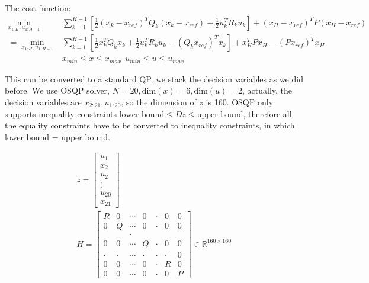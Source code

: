 The cost function:
\begin{align*}
    \min_{x_{1:H}, u_{1:H-1}}   & \sum_{k=1}^{H-1} [\frac{1}{2} (x_k-x_{ref})^T Q_k (x_k-x_{ref}) + \frac{1}{2} u_k^T R_k u_k] + (x_H-x_{ref})^T P (x_H-x_{ref}) \\
    = \min_{x_{1:H}, u_{1:H-1}} & \sum_{k=1}^{H-1} [\frac{1}{2} x_k^T Q_k x_k + \frac{1}{2} u_k^T R_k u_k - (Q_kx_{ref})^Tx_k] + x_H^T P x_H - (Px_{ref})^Tx_H \\
                                & x_{min}\leq x \leq x_{max} \ \  u_{min}\leq u \leq u_{max}
\end{align*}

This can be converted to a standard QP, we stack the decision variables as we did before. We use OSQP solver, $N=20, \text{dim}(x)=6, \text{dim}(u)=2$, actually, the decision variables are $x_{2:21}, u_{1:20}$, so the dimension of $z$ is 160. OSQP only supports inequality constraints $\text{lower bound} \le Dz \le \text{upper bound}$, therefore all the equality constraints have to be converted to inequality constraints, in which lower bound = upper bound.

\begin{gather*}
    z=\begin{bmatrix}
    u_{1}\\
    x_{2}\\
    u_{2}\\
    \vdots \\
    u_{20}\\
    x_{21}
    \end{bmatrix}\\
    H=\begin{bmatrix}
    R & 0 & \cdots  & 0 & \cdotp  & 0 & 0\\
    0 & Q & \cdots  & 0 & \cdotp  & 0 & 0\\
     &  & \cdotp  &  &  &  & \\
    0 & 0 & \cdots  & Q & \cdotp  & 0 & 0\\
    \cdotp  & \cdotp  & \cdots  & \cdotp  & \cdotp  & \cdotp  & 0\\
    0 & 0 & \cdots  & 0 & \cdotp  & R & 0\\
    0 & 0 & \cdots  & 0 & \cdotp  & 0 & P
    \end{bmatrix} \in \mathbb{R}^{160\times 160}
\end{gather*}

